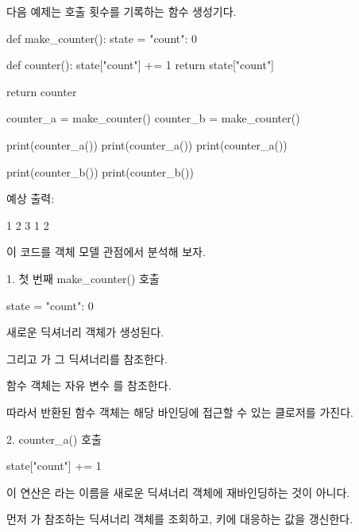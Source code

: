 다음 예제는 호출 횟수를 기록하는 함수 생성기다.

\begin{dhkcode}
def make_counter():
    state = {"count": 0}

    def counter():
        state["count"] += 1
        return state["count"]

    return counter


counter_a = make_counter()
counter_b = make_counter()

print(counter_a())
print(counter_a())
print(counter_a())

print(counter_b())
print(counter_b())
\end{dhkcode}

예상 출력:

\begin{dhkzsh}
1
2
3
1
2
\end{dhkzsh}

이 코드를 객체 모델 관점에서 분석해 보자.

\begin{dhknote}
\begin{dhksmry}[centered]
1. 첫 번째 make_counter() 호출
\end{dhksmry}
\end{dhknote}

\begin{dhkcode}
state = {"count": 0}
\end{dhkcode}

새로운 딕셔너리 객체가 생성된다.

그리고 가 그 딕셔너리를 참조한다.

 함수 객체는 자유 변수 를 참조한다.

따라서 반환된 함수 객체는 해당 바인딩에 접근할 수 있는 클로저를 가진다.

\begin{dhknote}
\begin{dhksmry}[centered]
2. counter_a() 호출
\end{dhksmry}
\end{dhknote}

\begin{dhkcode}
state["count"] += 1
\end{dhkcode}

이 연산은 라는 이름을 새로운 딕셔너리 객체에 재바인딩하는 것이 아니다.

먼저 가 참조하는 딕셔너리 객체를 조회하고,  키에 대응하는 값을 갱신한다.

